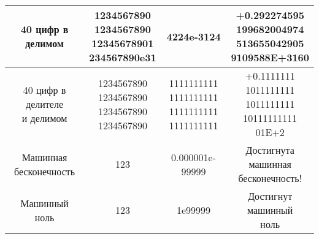 \begin{longtable}{|c|c|c|c|}
	\hline
	40 цифр в делимом & \makecell{1234567890\\1234567890\\12345678901\\234567890e31} & 4224e-3124 & \makecell{+0.292274595\\199682004974\\513655042905\\9109588E+3160} \\
	\hline
	\makecell{40 цифр в делителе\\и делимом} & \makecell{1234567890\\1234567890\\1234567890\\1234567890} & \makecell{1111111111\\1111111111\\1111111111\\1111111111} & \makecell{+0.1111111\\1011111111\\1011111111\\10111111111\\01E+2} \\
	\hline
	\makecell{Машинная\\бесконечность}& 123 & 0.000001e-99999 &\makecell{Достигнута\\машинная\\бесконечность!}\\
	\hline
	Машинный ноль & 123 & 1e99999 & \makecell{Достигнут\\машинный\\ноль }\\
	\hline
\end{longtable}

